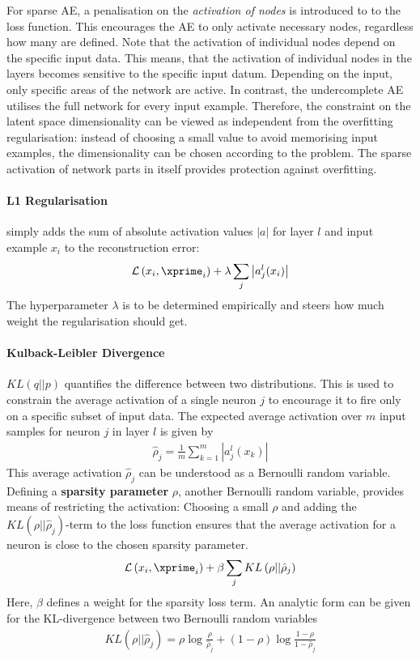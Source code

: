 For sparse AE, a penalisation on the \emph{activation of nodes} is introduced to
to the loss function. This encourages the AE to only activate necessary nodes,
regardless how many are defined. Note that the activation of individual nodes
depend on the specific input data. This means, that the activation of individual
nodes in the layers becomes sensitive to the specific input datum. Depending on
the input, only specific areas of the network are active. In contrast, the
undercomplete AE utilises the full network for every input example. Therefore,
the constraint on the latent space dimensionality can be viewed as independent
from the overfitting regularisation: instead of choosing a small value to avoid
memorising input examples, the dimensionality can be chosen according to the
problem. The sparse activation of network parts in itself provides protection
against overfitting.

\paragraph{L1 Regularisation} simply adds the sum of absolute activation values
$|a|$ for layer $l$ and input example $x_i$ to the reconstruction error:
\begin{align}
{\cal L}\left( {x_i,\xprime_i} \right) + \lambda \sum\limits_j {\left| {a_j^{l}(x_i)} \right|}
\end{align}
The hyperparameter $\lambda$ is to be determined empirically and steers how much
weight the regularisation should get.

\paragraph{Kulback-Leibler Divergence} $KL(q||p)$ quantifies the difference
between two distributions. This is used to constrain the average activation of a
single neuron $j$ to encourage it to fire only on a specific subset of input
data. The expected average activation over $m$ input samples for neuron $j$ in
layer $l$ is given by
\begin{align}
  {\hat \rho }_j=\frac{1}{m}\sum\limits_{k=1}^m|a_j^l(x_k)|
\end{align}
This average activation ${\hat \rho }_j$ can be understood as a Bernoulli random
variable. Defining a \textbf{sparsity parameter} $\rho$, another Bernoulli
random variable, provides means of restricting the activation: Choosing a small
$\rho$ and adding the $KL({\rho ||{{\hat \rho }_ j}})$-term to the loss function
ensures that the average activation for a neuron is close to the chosen sparsity
parameter.
\begin{align}
{\cal L}\left( {x_i,\xprime_i} \right) 
+ \beta \sum\limits_j {KL\left( {\rho ||{{\hat \rho }_ j}} \right)}
\end{align}
Here, $\beta$ defines a weight for the sparsity loss term. An analytic form can
be given for the KL-divergence between two Bernoulli random variables
\begin{align}
KL({\rho ||{{\hat \rho }_ j}})={\rho \log \frac{\rho }{{{{\hat\rho }_ j}}}}+ \left( {1 - \rho } \right)\log \frac{{1 - \rho }}{{1 - {{\hat \rho }_ j}}}
\end{align}

